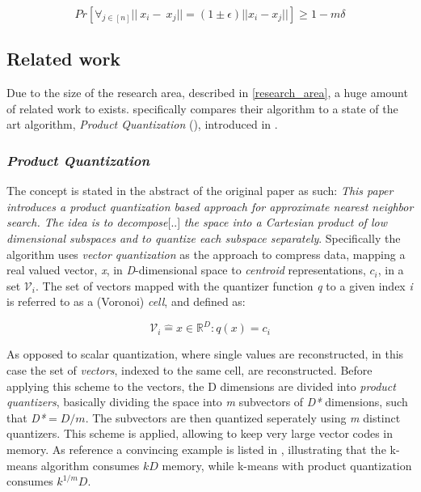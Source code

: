 \begin{equation}
Pr[\forall{}_{j\in{}[n]} ||~x_i-~x_j||= (1\pm\epsilon)||x_i-x_j||] \geq 1 - m\delta
\end{equation}

\subsection{Related work}
\label{state_of_the_art}
Due to the size of the research area, described in \ref{research_area}, a huge amount of related work to \qs{} exists. \cite{wagner17} specifically compares their algorithm to a state of the art algorithm, \textit{Product Quantization} (\pq{}), introduced in \cite{schmid9}. %

\subsubsection{\textit{Product Quantization}}
\label{sec:pq}
The \pq{} concept is stated in the abstract of the original paper as such: \textit{This paper introduces a product quantization based approach for approximate nearest neighbor search. The idea is to decompose}[..] \textit{the space into a Cartesian product of low dimensional subspaces and to quantize each subspace separately}. Specifically the algorithm uses \textit{vector quantization} as the approach to compress data, mapping a real valued vector, \textit{x}, in \textit{D}-dimensional space to \textit{centroid} representations, \textit{$c_i$}, in a set $\mathcal{V}_i$\cite[p.3 II-A]{schmid9}. The set of vectors mapped with the quantizer function \textit{q} to a given index \textit{i} is referred to as a (Voronoi) \textit{cell}, and defined as:

\begin{equation}
	\mathcal{V}_i\mathrel{\hat=}{x\in\mathbb{R}^D : q(x)=c_i}
\end{equation}

As opposed to scalar quantization, where single values are reconstructed, in this case the set of \textit{vectors}, indexed to the same cell, are reconstructed. Before applying this scheme to the vectors, the D dimensions are divided into \textit{product quantizers}, basically dividing the space into \textit{m} subvectors of \textit{D*} dimensions, such that \textit{D*$=D/m$}\cite[p.3 II-B]{schmid9}. The subvectors are then quantized seperately using \textit{m} distinct quantizers. This scheme is applied, allowing to keep very large vector codes in memory. As reference a convincing example is listed in \cite[Table I, p. 4]{schmid9}, illustrating that the k-means algorithm consumes $kD$ memory, while k-means with product quantization consumes  $k^{1/m}D$.

